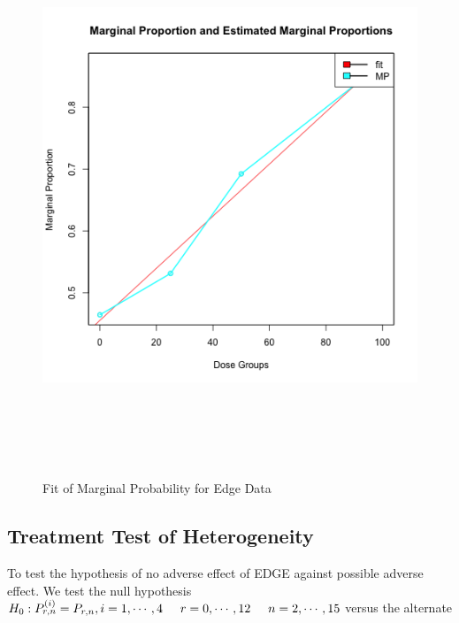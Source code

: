 \documentclass[12pt,oneside]{report}
\theoremstyle{definition}
\theoremstyle{mystyle}
\begin{document}
\begin{figure}[h]
	\begin{center}
		\includegraphics*[height=15cm,width=15cm]{fitedge.png}\
	\end{center}
	\vspace{-0.3in}
	\caption{ Fit of Marginal Probability for Edge Data }
	\label{Fig:p3}
\end{figure}





\newpage
\subsection{Treatment Test of Heterogeneity}
To test the hypothesis of no adverse effect of EDGE against possible adverse effect. We test the null hypothesis 
$H_{0}:P^{(i)}_{r,n}=P_{r,n},i=1,\cdots,4 \hspace{5mm}r=0,\cdots,12 \hspace{5mm} n=2,\cdots,15$ \hspace{5mm}  versus the alternate
\end{document}

